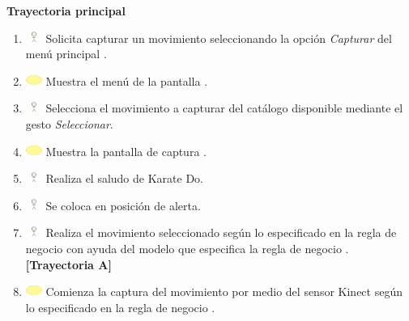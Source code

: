 \textbf{\large{Trayectoria principal}}

\begin{enumerate}
	\item \includegraphics[width=15pt, height=10pt]{./Figuras/iconosCU/usuario.png} Solicita capturar un movimiento seleccionando la opción \textit{Capturar} del menú principal .	
	\item \includegraphics[width=15pt]{./Figuras/iconosCU/herramienta.png} Muestra el menú de la pantalla .
	\item \includegraphics[width=15pt, height=10pt]{./Figuras/iconosCU/usuario.png} Selecciona el movimiento a capturar del catálogo disponible mediante el gesto \textit{Seleccionar}.
	\item \includegraphics[width=15pt]{./Figuras/iconosCU/herramienta.png} Muestra la pantalla de captura .
	\item \includegraphics[width=15pt, height=10pt]{./Figuras/iconosCU/usuario.png} Realiza el saludo de Karate Do.
	\item \includegraphics[width=15pt, height=10pt]{./Figuras/iconosCU/usuario.png} Se coloca en posición de alerta.
	\item \includegraphics[width=15pt, height=10pt]{./Figuras/iconosCU/usuario.png} Realiza el movimiento seleccionado según lo especificado en la regla de negocio  con ayuda del modelo que especifica la regla de negocio . \textbf{[Trayectoria A]}
	\item \includegraphics[width=15pt]{./Figuras/iconosCU/herramienta.png} Comienza la captura del movimiento por medio del sensor Kinect según lo especificado en la regla de negocio .

\end{enumerate}
